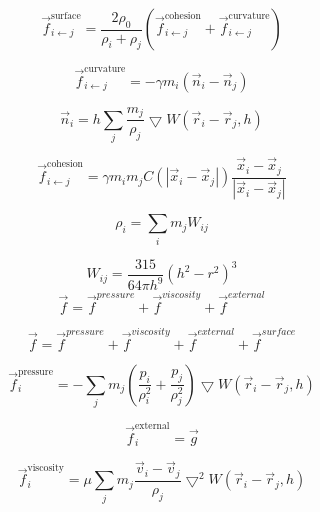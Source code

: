 \documentclass[a4paper]{paper}
\begin{document}
\begin{equation}
	\label{surface_tension}
	\vec{f}_{i\leftarrow j}^{\text{surface}} = \frac{2\rho_{0}}{\rho_{i}+\rho_{j}} (\vec{f}_{i\leftarrow j}^{\text{cohesion}} + \vec{f}_{i\leftarrow j}^{\text{curvature}})
\end{equation}


\begin{equation}
	\label{curvature}
	\vec{f}_{i\leftarrow j}^{\text{curvature}} = -\gamma m_{i}(\vec{n}_i - \vec{n}_j)
\end{equation}

\begin{equation}
	\vec{n}_{i} = h\sum_{j}\frac{m_{j}}{\rho_{j}}\bigtriangledown W (\vec{r}_{i}-\vec{r}_{j},h)
\end{equation}

\begin{equation}
	\label{cohesion}
	\vec{f}_{i\leftarrow j}^{\text{cohesion}} = \gamma m_{i} m_{j} C(|\vec{x}_i - \vec{x}_j|)\frac{\vec{x}_i - \vec{x}_j}{|\vec{x}_i - \vec{x}_j|}
\end{equation}

\begin{equation}
	\label{density}
	\rho_i = \sum_i{m_j W_{ij}}
\end{equation}

\begin{equation}
	\label{poly6}
	W_{ij} = \frac{315}{64 \pi h^9} (h^2-r^2)^3
\end{equation}
\begin{equation}
	\label{force}
	\vec{f} = \vec{f}^{pressure} + \vec{f}^{viscosity} + \vec{f}^{external}
\end{equation}

\begin{equation}
	\label{force_with_surface}
	\vec{f} = \vec{f}^{pressure} + \vec{f}^{viscosity} + \vec{f}^{external} + \vec{f}^{surface}
\end{equation}


\begin{equation}
	\label{force_pressure}
	\vec{f}^{\text{pressure}}_{i} = - \sum_{j}m_{j}(\frac{p_{i}}{\rho_{i}^2} +\frac{p_{j}}{\rho_{j}^2})\bigtriangledown W(\vec{r}_{i}-\vec{r}_{j},h)
\end{equation}

\begin{equation}
	\label{force_external}
	\vec{f}^{\text{external}}_{i} = \vec{g}
\end{equation}

\begin{equation}
	\label{force_viscosity}
	\vec{f}^{\text{viscosity}}_{i} = \mu \sum_{j}m_{j}\frac{\vec{v}_{i} - \vec{v}_{j}}{\rho_{j}}\bigtriangledown^2 W(\vec{r}_{i}-\vec{r}_{j},h)
\end{equation}
\end{document}
